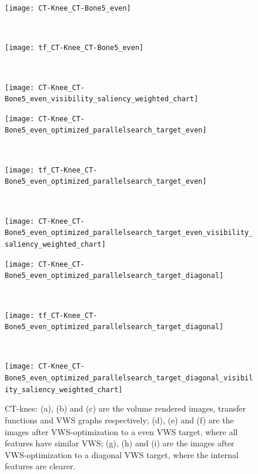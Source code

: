 \begin{figure}
	\centering
	\begin{minipage}{.9\textwidth}%
		\begin{minipage}{.3\textwidth}
			\texttt{[image: CT-Knee\_CT-Bone5\_even]}
			\subcaption{}
		\end{minipage}~
		\begin{minipage}{.3\textwidth}
			\texttt{[image: tf\_CT-Knee\_CT-Bone5\_even]}
			\subcaption{}
		\end{minipage}~
		\begin{minipage}{.4\textwidth}
			\texttt{[image: CT-Knee\_CT-Bone5\_even\_visibility\_saliency\_weighted\_chart]}
			\subcaption{}
		\end{minipage}
		
		\begin{minipage}{.3\textwidth}
			\texttt{[image: CT-Knee\_CT-Bone5\_even\_optimized\_parallelsearch\_target\_even]}
			\subcaption{}
		\end{minipage}~
		\begin{minipage}{.3\textwidth}
			\texttt{[image: tf\_CT-Knee\_CT-Bone5\_even\_optimized\_parallelsearch\_target\_even]}
			\subcaption{}
		\end{minipage}~
		\begin{minipage}{.4\textwidth}
			\texttt{[image: CT-Knee\_CT-Bone5\_even\_optimized\_parallelsearch\_target\_even\_visibility\_saliency\_weighted\_chart]}
			\subcaption{}
		\end{minipage}
		
		\begin{minipage}{.3\textwidth}
			\texttt{[image: CT-Knee\_CT-Bone5\_even\_optimized\_parallelsearch\_target\_diagonal]}
			\subcaption{}
		\end{minipage}~
		\begin{minipage}{.3\textwidth}
			\texttt{[image: tf\_CT-Knee\_CT-Bone5\_even\_optimized\_parallelsearch\_target\_diagonal]}
			\subcaption{}
		\end{minipage}~
		\begin{minipage}{.4\textwidth}
			\texttt{[image: CT-Knee\_CT-Bone5\_even\_optimized\_parallelsearch\_target\_diagonal\_visibility\_saliency\_weighted\_chart]}
			\subcaption{}
		\end{minipage}
	\end{minipage}
	\caption[CT-Knee: volume rendered images, transfer functions and VWS graphs]{CT-knee: (a), (b) and (c) are the volume rendered images, transfer functions and VWS graphs respectively; (d), (e) and (f) are the images after VWS-optimization to a even VWS target, where all features have similar VWS; (g), (h) and (i) are the images after VWS-optimization to a diagonal VWS target, where the internal features are clearer.
	}
	\label{fig:CT-Knee_CT-Bone5_even}
\end{figure}

